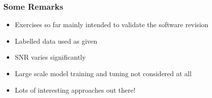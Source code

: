 \documentclass{beamer}
\begin{document}
\begin{frame}
    \frametitle{Some Remarks}

    \begin{itemize}
        \item Exercises so far mainly intended to validate the software revision
        \item Labelled data used as given
        \item SNR varies significantly
        \item Large scale model training and tuning not considered at all
        \item Lots of interesting approaches out there!
    \end{itemize}
\end{frame}


%
\end{document}
